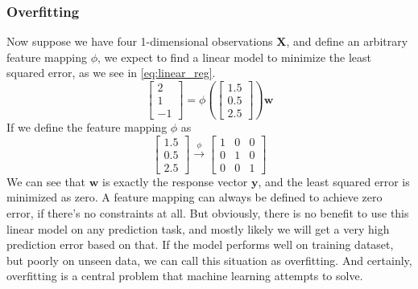 \documentclass{article}
\newcommand{\vct}[1]{\ensuremath{\boldsymbol{#1}}} %
\newcommand{\bmat}[1]{\begin{bmatrix}#1\end{bmatrix}}
\begin{document}
\subsubsection*{Overfitting}
Now suppose we have four 1-dimensional observations $ \vct X $, and define an arbitrary feature mapping $ \phi $, we expect to find a linear model to minimize the least squared error, as we see in \eqref{eq:linear_reg}. 
\[ \bmat{2 \\ 1 \\-1} = \phi\left( \bmat{1.5 \\ 0.5 \\ 2.5} \right)  \vct w \]
If we define the feature mapping $ \phi $ as 
\[  \bmat{1.5 \\ 0.5 \\ 2.5} \xrightarrow{\phi} \bmat{1 & 0 & 0 \\ 0 & 1 & 0\\ 0 & 0 & 1}\]
We can see that $ \vct w $ is exactly the response vector $ \vct y $, and the least squared error is minimized as zero. A feature mapping can always be defined to achieve zero error, if there's no constraints at all. But obviously, there is no benefit to use this linear model on any prediction task, and mostly likely we will get a very high prediction error based on that. If the model performs well on training dataset, but poorly on unseen data, we can call this situation as overfitting. And certainly, overfitting is a central problem that machine learning attempts to solve. 
\end{document}

